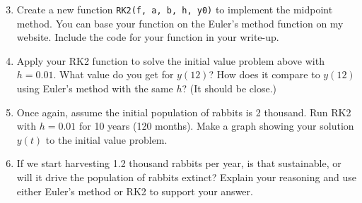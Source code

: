 \documentclass[10pt]{article}
\begin{document}
\begin{enumerate}
\setcounter{enumi}{2}
\item Create a new function \verb|RK2(f, a, b, h, y0)| to implement the midpoint method. You can base your function on the Euler's method function on my website. Include the code for your function in your write-up. 


\item Apply your RK2 function to solve the initial value problem above with $h = 0.01$. What value do you get for $y(12)$?  How does it compare to $y(12)$ using Euler's method with the same $h$? (It should be close.)


\item Once again, assume the initial population of rabbits is 2 thousand. Run RK2 with $h = 0.01$ for 10 years (120 months).  Make a graph showing your solution $y(t)$ to the initial value problem.  

\item If we start harvesting 1.2 thousand rabbits per year, is that sustainable, or will it drive the population of rabbits extinct? Explain your reasoning and use either Euler's method or RK2 to support your answer.  

\end{enumerate}
\end{document}
